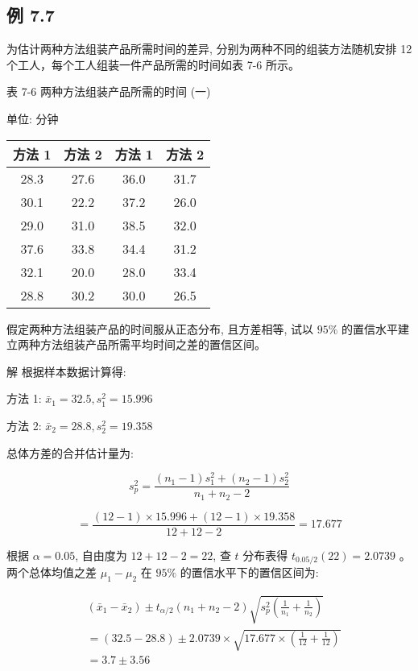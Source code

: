 \documentclass[10pt]{article}
\begin{document}
\begin{CJK*}{UTF8}{bsmi}
\section*{例 7.7}
为估计两种方法组装产品所需时间的差异, 分别为两种不同的组装方法随机安排 12 个工人，每个工人组装一件产品所需的时间如表 7-6 所示。

表 7-6 两种方法组装产品所需的时间 (一)

单位: 分钟

\begin{center}
\begin{tabular}{cc||cc}
\hline
方法 1 & 方法 2 & 方法 1 & 方法 2 \\
\hline
28.3 & 27.6 & 36.0 & 31.7 \\
30.1 & 22.2 & 37.2 & 26.0 \\
29.0 & 31.0 & 38.5 & 32.0 \\
37.6 & 33.8 & 34.4 & 31.2 \\
32.1 & 20.0 & 28.0 & 33.4 \\
28.8 & 30.2 & 30.0 & 26.5 \\
\hline
\end{tabular}
\end{center}

假定两种方法组装产品的时间服从正态分布, 且方差相等, 试以 $95 \%$ 的置信水平建立两种方法组装产品所需平均时间之差的置信区间。

解 根据样本数据计算得:

方法 1: $\bar{x}_{1}=32.5, s_{1}^{2}=15.996$

方法 2: $\bar{x}_{2}=28.8, s_{2}^{2}=19.358$

总体方差的合并估计量为:

$$
s_{p}^{2}=\frac{\left(n_{1}-1\right) s_{1}^{2}+\left(n_{2}-1\right) s_{2}^{2}}{n_{1}+n_{2}-2}
$$

$$
=\frac{(12-1) \times 15.996+(12-1) \times 19.358}{12+12-2}=17.677
$$

根据 $\alpha=0.05$, 自由度为 $12+12-2=22$, 查 $t$ 分布表得 $t_{0.05 / 2}(22)=2.0739$ 。两个总体均值之差 $\mu_{1}-\mu_{2}$ 在 $95 \%$ 的置信水平下的置信区间为:

$$
\begin{aligned}
& \left(\bar{x}_{1}-\bar{x}_{2}\right) \pm t_{\alpha / 2}\left(n_{1}+n_{2}-2\right) \sqrt{s_{p}^{2}\left(\frac{1}{n_{1}}+\frac{1}{n_{2}}\right)} \\
& =(32.5-28.8) \pm 2.0739 \times \sqrt{17.677 \times\left(\frac{1}{12}+\frac{1}{12}\right)} \\
& =3.7 \pm 3.56
\end{aligned}
$$


\end{CJK*}
\end{document}
